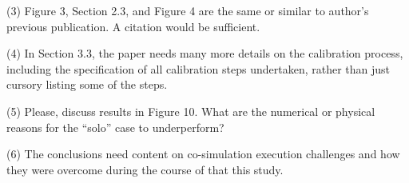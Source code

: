 \documentclass[answers,12pt]{exam}
\begin{document}
\begin{questions}
\question 
(3) Figure 3, Section 2.3, and Figure 4 are the same or similar to author’s previous publication. A citation would be sufficient. 
\begin{solution}

\end{solution}

\question 
(4) In Section 3.3, the paper needs many more details on the calibration process, including the specification of all calibration steps undertaken, rather than just cursory listing some of the steps. 
\begin{solution}

\end{solution}

\question 
(5) Please, discuss results in Figure 10. What are the numerical or physical reasons for the “solo” case to underperform? 
\begin{solution}

\end{solution}

\question 
(6) The conclusions need content on co-simulation execution challenges and how they were overcome during the course of that this study.
\begin{solution}

\end{solution}
\end{questions}
\end{document}
